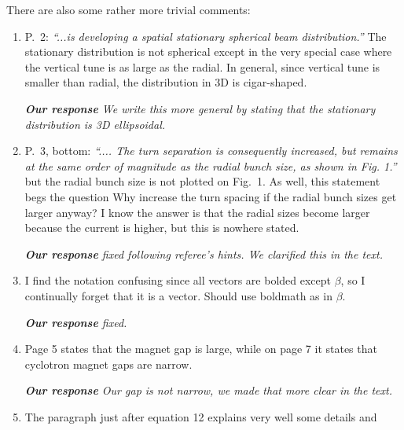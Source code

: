 \documentclass[10pt]{report}
\begin{document}
 There are also some rather more trivial comments:
 
 \begin{enumerate}
  \item P.\ 2: \textit{``...is developing a spatial
 stationary spherical beam distribution.''} The stationary distribution is not
 spherical except in the very special case where the vertical tune is as large
 as the radial. In general, since vertical tune is smaller than radial, the
 distribution in 3D is cigar-shaped.


 \vspace{+2mm}
 {\it {\bf Our response}  
 We write this more general by stating that the stationary distribution is 3D ellipsoidal.}
 \vspace{+2mm}

 
  \item P.\ 3, bottom: \textit{``.... The turn separation is consequently
 increased, but 
 remains at the same order of magnitude 
 as the radial bunch size, as shown in Fig. 1.''} but the radial bunch size is 
 not plotted on Fig.\ 1. As well, this statement begs the question Why increase
 the turn spacing if the radial bunch sizes get larger anyway? I know the answer
 is that the radial sizes become larger because the current is higher, but this
 is nowhere stated. 


 \vspace{+2mm}
 {\it {\bf Our response}  fixed following referee's hints.
 We clarified this in the text.}
 \vspace{+2mm}

 
  \item I find the notation confusing since all vectors are bolded except
 $\beta$, so I
 continually forget that it is a vector. Should use boldmath as in {\boldmath
 $\beta$}.
 
 \vspace{+2mm}
 {\it {\bf Our response} fixed.
 }
 \vspace{+2mm}
 

  \item Page 5 states that the magnet gap is large, while on page 7 it states
 that 
 cyclotron magnet gaps are narrow.


 \vspace{+2mm}
 {\it {\bf Our response}  
 Our gap is not narrow, we made that more clear in the text.}
 \vspace{+2mm}
 
  \item The paragraph just after equation 12 explains very well some details and
 

\end{enumerate}
\end{document}
